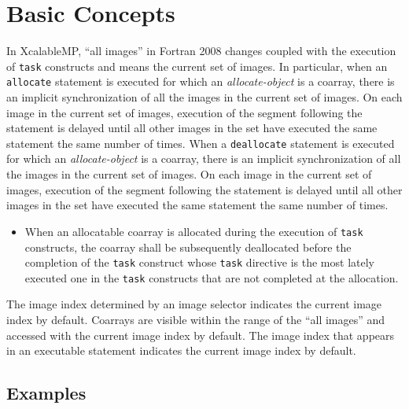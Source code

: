 \section{Basic Concepts}


In XcalableMP, ``all images'' in Fortran 2008 changes coupled with the 
execution of {\tt task} constructs and
 means the current set of images.
In particular,
when an {\tt allocate} statement is executed for which an {\it
allocate-object} is a coarray, there is an implicit synchronization of 
all the images in the current set of images.
On each image in the current set of images, execution of the segment 
following the statement is delayed until
all other images in the set have executed the same
statement the same number of times.
When a {\tt deallocate} statement is executed for which an {\it
allocate-object} is a coarray, there is an implicit synchronization of
all the images in the current set of images.
On each image in the current set of images, execution of the segment following the
statement is delayed until all other images in the set
have executed the same statement the same number of times.




\begin{itemize}
 \item 
When an allocatable coarray is allocated during the execution of
       {\tt task} constructs,
       the coarray shall be subsequently deallocated before the completion of 
       the {\tt task} construct whose
       {\tt task} directive is the most lately executed one 
       in the {\tt task} constructs that are not completed at the allocation.

\end{itemize}


The image index determined by an image selector 
indicates the current image index by default.
Coarrays are visible within the range of the ``all images'' and
accessed with the current image index by default.
The image index that appears in an executable statement
indicates the current image index by default.


\subsection{Examples}


